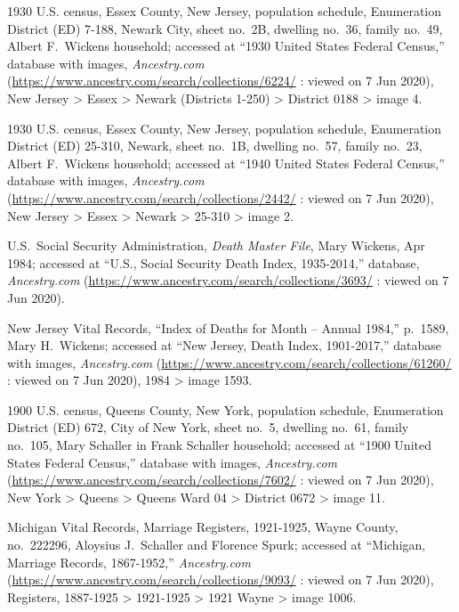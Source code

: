 \begin{thebibliography}{999}
	1930 U.S. census, Essex County, New Jersey, population schedule, Enumeration District (ED) 7-188, Newark City, sheet no.\ 2B, dwelling no.\ 36, family no.\ 49, Albert F.\ Wickens household; accessed at ``1930 United States Federal Census,'' database with images, \textit{Ancestry.com} (\url{https://www.ancestry.com/search/collections/6224/} : viewed on 7 Jun 2020), New Jersey > Essex > Newark (Districts 1-250) > District 0188 > image 4.
	
	1930 U.S. census, Essex County, New Jersey, population schedule, Enumeration District (ED) 25-310, Newark, sheet no.\ 1B, dwelling no.\ 57, family no.\ 23, Albert F.\ Wickens household; accessed at ``1940 United States Federal Census,'' database with images, \textit{Ancestry.com} (\url{https://www.ancestry.com/search/collections/2442/} : viewed on 7 Jun 2020), New Jersey > Essex > Newark > 25-310 > image 2.
	
	U.S.\ Social Security Administration, \textit{Death Master File}, Mary Wickens, Apr 1984; accessed at ``U.S., Social Security Death Index, 1935-2014,'' database, \textit{Ancestry.com} (\url{https://www.ancestry.com/search/collections/3693/} : viewed on 7 Jun 2020).
	
	New Jersey Vital Records, ``Index of Deaths for Month -- Annual 1984,'' p.\ 1589, Mary H.\ Wickens; accessed at ``New Jersey, Death Index, 1901-2017,'' database with images, \textit{Ancestry.com} (\url{https://www.ancestry.com/search/collections/61260/} : viewed on 7 Jun 2020), 1984 > image 1593.
	
	1900 U.S. census, Queens County, New York, population schedule, Enumeration District (ED) 672, City of New York, sheet no.\ 5, dwelling no.\ 61, family no.\ 105, Mary Schaller in Frank Schaller household; accessed at ``1900 United States Federal Census,'' database with images, \textit{Ancestry.com} (\url{https://www.ancestry.com/search/collections/7602/} : viewed on 7 Jun 2020), New York > Queens > Queens Ward 04 > District 0672 > image 11.
	
	Michigan Vital Records, Marriage Registers, 1921-1925, Wayne County, no.\ 222296, Aloysius J.\ Schaller and Florence Spurk; accessed at ``Michigan, Marriage Records, 1867-1952,'' \textit{Ancestry.com} (\url{https://www.ancestry.com/search/collections/9093/} : viewed on 7 Jun 2020), Registers, 1887-1925 > 1921-1925 > 1921 Wayne > image 1006.
	

\end{thebibliography}
